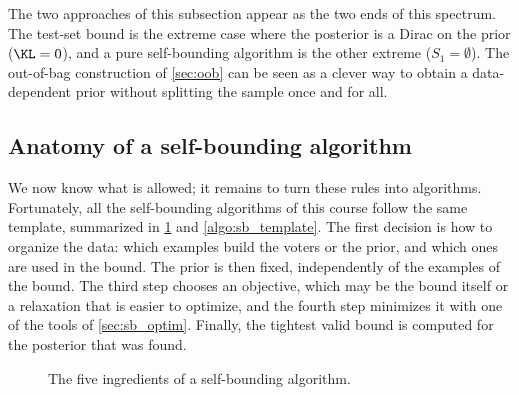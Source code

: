 The two approaches of this subsection appear as the two ends of this spectrum.
The test-set bound is the extreme case where
the posterior is a Dirac on the prior ($\KL=0$), and a pure self-bounding
algorithm is the other extreme ($S_1=\emptyset$). The out-of-bag construction of
\cref{sec:oob} can be seen as a clever way to obtain a data-dependent prior
without splitting the sample once and for all.

\subsection{Anatomy of a self-bounding algorithm}

We now know what is allowed; it remains to turn these rules into algorithms.
Fortunately, all the self-bounding algorithms of this course follow the same
template, summarized in \cref{fig:sb_pipeline} and \cref{algo:sb_template}. The
first decision is how to organize the data: which examples build the voters or the
prior, and which ones are used in the bound. The prior is then fixed,
independently of the examples of the bound. The third step chooses an
objective, which may be the bound itself or a relaxation that is easier to
optimize, and the fourth step minimizes it with one of the tools of
\cref{sec:sb_optim}. Finally, the tightest valid bound is computed for the
posterior that was found.

\begin{figure}[t]
\centering
{}
\caption{The five ingredients of a self-bounding algorithm.}
\label{fig:sb_pipeline}
\end{figure}

